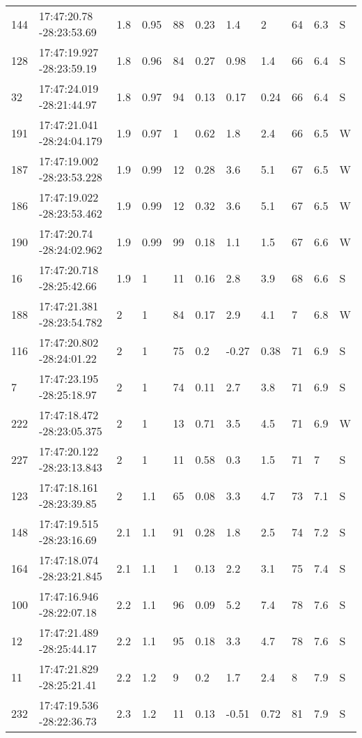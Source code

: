 \begin{deluxetable}[htp]
\begin{tabular}{lllllllllll}
144 & 17:47:20.78 -28:23:53.69 & 1.8 & 0.95 & 88 & 0.23 & 1.4 & 2 & 64 & 6.3\ee{24} & S \\
128 & 17:47:19.927 -28:23:59.19 & 1.8 & 0.96 & 84 & 0.27 & 0.98 & 1.4 & 66 & 6.4\ee{24} & S \\
32 & 17:47:24.019 -28:21:44.97 & 1.8 & 0.97 & 94 & 0.13 & 0.17 & 0.24 & 66 & 6.4\ee{24} & S \\
191 & 17:47:21.041 -28:24:04.179 & 1.9 & 0.97 & 1 & 0.62 & 1.8 & 2.4 & 66 & 6.5\ee{24} & W \\
187 & 17:47:19.002 -28:23:53.228 & 1.9 & 0.99 & 12 & 0.28 & 3.6 & 5.1 & 67 & 6.5\ee{24} & W \\
186 & 17:47:19.022 -28:23:53.462 & 1.9 & 0.99 & 12 & 0.32 & 3.6 & 5.1 & 67 & 6.5\ee{24} & W \\
190 & 17:47:20.74 -28:24:02.962 & 1.9 & 0.99 & 99 & 0.18 & 1.1 & 1.5 & 67 & 6.6\ee{24} & W \\
16 & 17:47:20.718 -28:25:42.66 & 1.9 & 1 & 11 & 0.16 & 2.8 & 3.9 & 68 & 6.6\ee{24} & S \\
188 & 17:47:21.381 -28:23:54.782 & 2 & 1 & 84 & 0.17 & 2.9 & 4.1 & 7 & 6.8\ee{24} & W \\
116 & 17:47:20.802 -28:24:01.22 & 2 & 1 & 75 & 0.2 & -0.27 & 0.38 & 71 & 6.9\ee{24} & S \\
7 & 17:47:23.195 -28:25:18.97 & 2 & 1 & 74 & 0.11 & 2.7 & 3.8 & 71 & 6.9\ee{24} & S \\
222 & 17:47:18.472 -28:23:05.375 & 2 & 1 & 13 & 0.71 & 3.5 & 4.5 & 71 & 6.9\ee{24} & W \\
227 & 17:47:20.122 -28:23:13.843 & 2 & 1 & 11 & 0.58 & 0.3 & 1.5 & 71 & 7\ee{24} & S \\
123 & 17:47:18.161 -28:23:39.85 & 2 & 1.1 & 65 & 0.08 & 3.3 & 4.7 & 73 & 7.1\ee{24} & S \\
148 & 17:47:19.515 -28:23:16.69 & 2.1 & 1.1 & 91 & 0.28 & 1.8 & 2.5 & 74 & 7.2\ee{24} & S \\
164 & 17:47:18.074 -28:23:21.845 & 2.1 & 1.1 & 1 & 0.13 & 2.2 & 3.1 & 75 & 7.4\ee{24} & S \\
100 & 17:47:16.946 -28:22:07.18 & 2.2 & 1.1 & 96 & 0.09 & 5.2 & 7.4 & 78 & 7.6\ee{24} & S \\
12 & 17:47:21.489 -28:25:44.17 & 2.2 & 1.1 & 95 & 0.18 & 3.3 & 4.7 & 78 & 7.6\ee{24} & S \\
11 & 17:47:21.829 -28:25:21.41 & 2.2 & 1.2 & 9 & 0.2 & 1.7 & 2.4 & 8 & 7.9\ee{24} & S \\
232 & 17:47:19.536 -28:22:36.73 & 2.3 & 1.2 & 11 & 0.13 & -0.51 & 0.72 & 81 & 7.9\ee{24} & S \\

\end{tabular}
\end{deluxetable}
